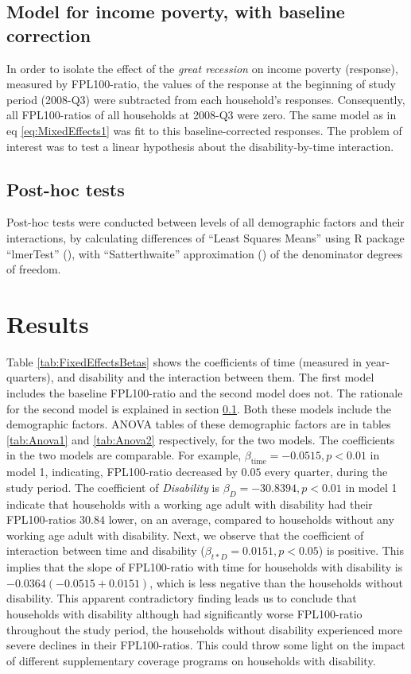 \documentclass[11pt]{extarticle} %
\begin{document}
\subsection{Model for income poverty, with baseline correction} \label{baselineCorrection}
In order to isolate the effect of the {\emph{great recession}} on income poverty (response), measured by FPL100-ratio, the values of the response at the beginning of study period (2008-Q3) were subtracted from each household's responses. Consequently, all FPL100-ratios of all households at 2008-Q3 were zero. The same model as in eq \ref{eq:MixedEffects1} was fit to this baseline-corrected responses. The problem of interest was to test a linear hypothesis about the disability-by-time interaction. 

\subsection{Post-hoc tests}
Post-hoc tests were conducted between levels of all demographic factors and their interactions, by calculating differences of ``Least Squares Means'' using R package ``lmerTest'' (\cite{Kuznetsova_etal_2015_R-lmerTest}), with ``Satterthwaite'' approximation (\cite{Satterthwaite_1946_Biometrics}) of the denominator degrees of freedom. 

\section{Results}
Table \ref{tab:FixedEffectsBetas} shows the coefficients of time (measured in year-quarters), and disability and the interaction between them. The first model includes the baseline FPL100-ratio and the second model does not. The rationale for the second model is explained in section \ref{baselineCorrection}. Both these models include the demographic factors. ANOVA tables of these demographic factors are in tables \ref{tab:Anova1} and \ref{tab:Anova2} respectively, for the two models. The coefficients in the two models are comparable. For example, $\beta_{\text{time}} = -0.0515, p < 0.01$ in model 1, indicating, FPL100-ratio decreased by $0.05$ every quarter, during the study period. The coefficient of {\emph{Disability}} is $\beta_D = -30.8394, p < 0.01$ in model 1 indicate that households with a working age adult with disability had their FPL100-ratios $30.84$ lower, on an average, compared to households without any working age adult with disability. Next, we observe that the coefficient of interaction between time and disability ($\beta_{t*D} = 0.0151, p < 0.05$) is positive. This implies that the slope of FPL100-ratio with time for households with disability is $-0.0364 (-0.0515 + 0.0151)$, which is less negative than the households without disability. This apparent contradictory finding leads us to conclude that households with disability although had significantly worse FPL100-ratio throughout the study period, the households without disability experienced more severe declines in their FPL100-ratios. This could throw some light on the impact of different supplementary coverage programs on households with disability. 
\end{document}
